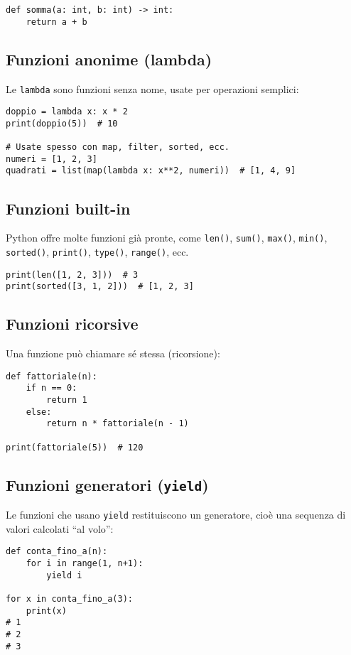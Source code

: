 \documentclass[a4paper,12pt]{article}
\begin{document}
\begin{lstlisting}
def somma(a: int, b: int) -> int:
    return a + b
\end{lstlisting}

\subsection*{Funzioni anonime (lambda)}
Le \texttt{lambda} sono funzioni senza nome, usate per operazioni semplici:

\begin{lstlisting}
doppio = lambda x: x * 2
print(doppio(5))  # 10

# Usate spesso con map, filter, sorted, ecc.
numeri = [1, 2, 3]
quadrati = list(map(lambda x: x**2, numeri))  # [1, 4, 9]
\end{lstlisting}

\subsection*{Funzioni built-in}
Python offre molte funzioni già pronte, come \texttt{len()}, \texttt{sum()}, \texttt{max()}, \texttt{min()}, \texttt{sorted()}, \texttt{print()}, \texttt{type()}, \texttt{range()}, ecc.

\begin{lstlisting}
print(len([1, 2, 3]))  # 3
print(sorted([3, 1, 2]))  # [1, 2, 3]
\end{lstlisting}

\subsection*{Funzioni ricorsive}
Una funzione può chiamare sé stessa (ricorsione):

\begin{lstlisting}
def fattoriale(n):
    if n == 0:
        return 1
    else:
        return n * fattoriale(n - 1)

print(fattoriale(5))  # 120
\end{lstlisting}

\subsection*{Funzioni generatori (\texttt{yield})}
Le funzioni che usano \texttt{yield} restituiscono un generatore, cioè una sequenza di valori calcolati “al volo”:

\begin{lstlisting}
def conta_fino_a(n):
    for i in range(1, n+1):
        yield i

for x in conta_fino_a(3):
    print(x)
# 1
# 2
# 3
\end{lstlisting}
\end{document}
